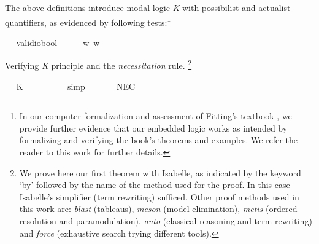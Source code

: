 \begin{isabellebody}
\isamarkuptrue%
%
\begin{isamarkuptext}%
The above definitions introduce modal logic \emph{K} with possibilist and actualist quantifiers,
as evidenced by following tests:\footnote{In our computer-formalization and assessment of Fitting's textbook \cite{J35},
we provide further evidence that our embedded logic works as intended by formalizing and verifying
the book's theorems and examples. We refer the reader to this work for further details.}%
\end{isamarkuptext}\isamarkuptrue%
\ \isamarkupfalse%
\ valid{\isacharcolon}{\isacharcolon}{\isachardoublequoteopen}io{\isasymRightarrow}bool{\isachardoublequoteclose}\ {\isacharparenleft}{\isachardoublequoteopen}{\isasymlfloor}{\isacharunderscore}{\isasymrfloor}{\isachardoublequoteclose}{\isacharparenright}\ \ {\isachardoublequoteopen}{\isasymlfloor}{\isasympsi}{\isasymrfloor}\ {\isasymequiv}\ \ {\isasymforall}w{\isachardot}{\isacharparenleft}{\isasympsi}\ w{\isacharparenright}{\isachardoublequoteclose}\ %
%
\begin{isamarkuptext}%
Verifying \emph{K} principle and the \emph{necessitation} rule.
 \footnote{We prove here our first theorem with Isabelle, as indicated by the keyword `by' followed by
 the name of the method used for the proof. In this case Isabelle's simplifier (term rewriting) sufficed.
 Other proof methods used in this work are: \emph{blast} (tableaus), \emph{meson} (model elimination),
 \emph{metis} (ordered resolution and paramodulation), \emph{auto} (classical reasoning and term rewriting)
 and \emph{force} (exhaustive search trying different tools).}%
\end{isamarkuptext}\isamarkuptrue%
\ \isamarkupfalse%
\ K{\isacharcolon}\ {\isachardoublequoteopen}{\isasymlfloor}{\isacharparenleft}\isactrlbold {\isasymbox}{\isacharparenleft}{\isasymphi}\ \isactrlbold {\isasymrightarrow}\ {\isasympsi}{\isacharparenright}{\isacharparenright}\ \isactrlbold {\isasymrightarrow}\ {\isacharparenleft}\isactrlbold {\isasymbox}{\isasymphi}\ \isactrlbold {\isasymrightarrow}\ \isactrlbold {\isasymbox}{\isasympsi}{\isacharparenright}{\isasymrfloor}{\isachardoublequoteclose}%
\ %
%
\isamarkupfalse%
\ simp\ \ \ \ %
%
%
%
\isanewline
\ \isamarkupfalse%
\ NEC{\isacharcolon}\ {\isachardoublequoteopen}{\isasymlfloor}{\isasymphi}{\isasymrfloor}\ {\isasymLongrightarrow}\ {\isasymlfloor}\isactrlbold {\isasymbox}{\isasymphi}{\isasymrfloor}{\isachardoublequoteclose}%

\end{isabellebody}
